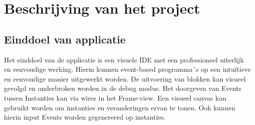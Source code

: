 \documentclass[]{article}
\begin{document}
\section{Beschrijving van het project}
\label{Beschrijving}
\subsection{Einddoel van applicatie}
Het einddoel van de applicatie is een visuele IDE met een professioneel uiterlijk en eenvoudige werking. Hierin kunnen event-based programma´s op een intu\"itieve en eenvoudige manier uitgewerkt worden. De uitvoering van blokken kan visueel gevolgd en onderbroken worden in de debug modus. Het doorgeven van Events tussen Instanties kan via wires in het Frame-view. Een visueel canvas kan gebruikt worden om instanties en veranderingen ervan te tonen. Ook kunnen hierin input Events worden gegenereerd op instanties.
\end{document}
